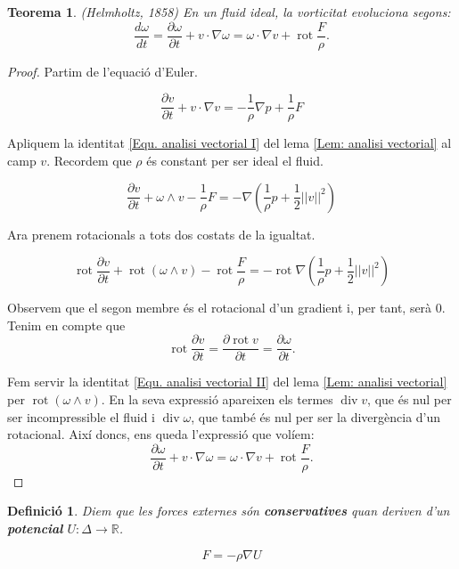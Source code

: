 \documentclass{article}
\numberwithin{equation}{section}
\DeclareMathOperator{\diver}{div}
\DeclareMathOperator{\rot}{rot}
\newtheorem{teorema}{Teorema}[section]
\newtheorem{definicio}{Definici\'{o}}[section]
\begin{document}
\begin{teorema}\label{Teo: Helmholtz}
(Helmholtz, 1858) En un fluid ideal, la vorticitat evoluciona segons:
\begin{equation}
\frac{d\omega}{dt}=\frac{\partial\omega}{\partial t}+v\cdot\nabla\omega=\omega\cdot\nabla v+\rot\frac{F}{\rho}.
\end{equation}
\end{teorema}
\begin{proof}
Partim de l'equaci\'{o} d'Euler.

\[\frac{\partial v}{\partial t}+v\cdot\nabla v=-\frac{1}{\rho}\nabla p+\frac{1}{\rho}F\]

Apliquem la identitat \eqref{Equ. analisi vectorial I} del lema \ref{Lem: analisi vectorial} al camp $v$. Recordem que $\rho$ \'{e}s constant per ser ideal el fluid.

\[\frac{\partial v}{\partial t}+\omega\wedge v-\frac{1}{\rho}F=-\nabla\left(\frac{1}{\rho}p+\frac{1}{2}||v||^2\right)\]

Ara prenem rotacionals a tots dos costats de la igualtat.

\[\rot\frac{\partial v}{\partial t}+\rot(\omega\wedge v)-\rot\frac{F}{\rho}=-\rot\nabla\left(\frac{1}{\rho}p+\frac{1}{2}||v||^2\right)\]

Observem que el segon membre \'{e}s el rotacional d'un gradient i, per tant, ser\`{a} 0. Tenim en compte que
\[\rot\frac{\partial v}{\partial t}=\frac{\partial\rot v}{\partial t}=\frac{\partial\omega}{\partial t}.\]

Fem servir la identitat \eqref{Equ. analisi vectorial II} del lema \ref{Lem: analisi vectorial} per $\rot(\omega\wedge v)$. En la seva expressi\'{o} apareixen els termes $\diver v$, que \'{e}s nul per ser incompressible el fluid i $\diver\omega$, que tamb\'{e} \'{e}s nul per ser la diverg\`{e}ncia d'un rotacional. Aix\'{i} doncs, ens queda l'expressi\'{o} que vol\'{i}em:
\[\frac{\partial\omega}{\partial t}+v\cdot\nabla\omega=\omega\cdot\nabla v+\rot\frac{F}{\rho}.\]
\end{proof}

\begin{definicio}
Diem que les forces externes s\'{o}n \textbf{conservatives} quan deriven d'un \textbf{potencial} $U:\Delta\rightarrow\mathbb{R}$.

\begin{equation}
F=-\rho\nabla U
\end{equation}
\end{definicio}
\end{document}
